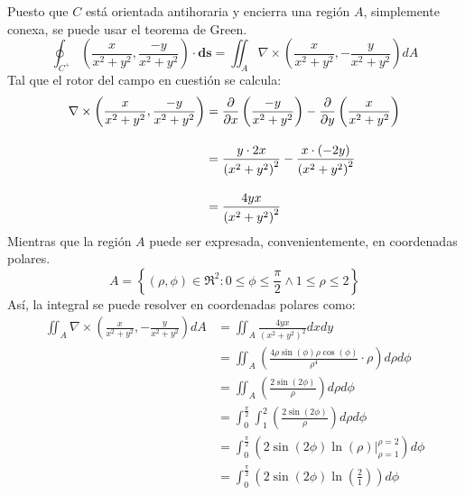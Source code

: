 \begin{solution}
\begin{figure}[H]
    \end{figure}
    Puesto que $C$ está orientada antihoraria y encierra una región $A$, simplemente conexa, se puede usar el teorema de Green.
    \begin{equation*}
        \oint_{C^+} \left(\frac{x}{x^2+y^2},\frac{-y}{x^2+y^2}\right)\cdot\boldsymbol{ds} = \iint_{A} \nabla \times \left(\frac{x}{x^2+y^2},-\frac{y}{x^2+y^2}\right)dA
    \end{equation*}
    Tal que el rotor del campo en cuestión se calcula:
    \begin{align*}
        \nabla \times \left(\frac{x}{x^2+y^2},\frac{-y}{x^2+y^2}\right) &= \frac{\partial}{\partial x}\left(\frac{-y}{x^2+y^2}\right) - \frac{\partial}{\partial y}\left(\frac{x}{x^2+y^2}\right)\\[10pt]
        &= \frac{y\cdot2x}{\left(x^2+y^2\right)^2} - \frac{x\cdot(-2y)}{\left(x^2+y^2\right)^2}\\[10pt]
        &= \frac{4yx}{\left(x^2+y^2\right)^2}
    \end{align*}
    Mientras que la región $A$ puede ser expresada, convenientemente, en coordenadas polares.
    \begin{equation*}
        A=\left\{(\rho,\phi)\in\Re^2:0\leq\phi\leq\frac{\pi}{2} \land 1\leq \rho \leq 2\right\}
    \end{equation*}
    Así, la integral se puede resolver en coordenadas polares como:
    \begin{align*}
        \iint_{A} \nabla \times \left(\frac{x}{x^2+y^2},-\frac{y}{x^2+y^2}\right)dA &= \iint_{A} \frac{4yx}{\left(x^2+y^2\right)^2}dxdy\\[10pt]
        &= \iint_{A}\left( \frac{4 \rho \sin{(\phi)} \rho \cos{(\phi)}}{\rho^4}\cdot \rho \right) d\rho d\phi\\[10pt]
        &= \iint_{A}\left( \frac{2 \sin{(2\phi)}}{\rho}\right) d\rho d\phi\\[10pt]
        &= \int^{\frac{\pi}{2}}_{0}\int^{2}_{1}\left( \frac{2 \sin{(2\phi)}}{\rho}\right) d\rho d\phi\\[10pt]
        &= \int^{\frac{\pi}{2}}_{0}\left(2\sin{(2\phi)}\left.\ln(\rho)\right|^{\rho=2}_{\rho=1}\right) d\phi\\[10pt]
        &= \int^{\frac{\pi}{2}}_{0}\left(2\sin{(2\phi)}\ln\left(\frac{2}{1}\right)\right) d\phi\\[10pt]

\end{align*}
\end{solution}
